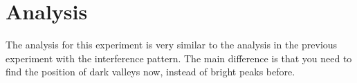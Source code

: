 \section{Analysis}
The analysis for this experiment is very similar to the analysis in the previous experiment with the interference pattern. The main difference is that you need to find the position of dark valleys now, instead of bright peaks before.
\newpage
